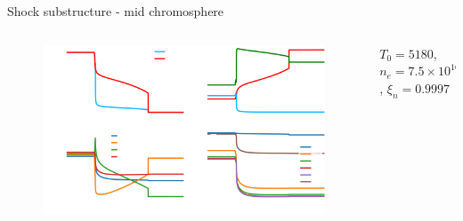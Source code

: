 \documentclass[10pt,aspectratio=169,usenames,dvipsnames]{beamer}
\begin{document}
\begin{frame}{Shock substructure - mid chromosphere}
\begin{columns}
\begin{column}{0.8\textwidth}
\begin{figure}
    \includegraphics[width=0.95\linewidth]{2023StAndrewsAstro/Figures/shocksub2_plot_midc_corrected.png}
    \label{fig:upperchromocontext}
\end{figure}
\end{column}
\begin{column}{0.2\textwidth}
    $T_0=5180$, $n_e=7.5\times 10^{16}$, $\xi_n=0.9997$
\end{column}
\end{columns}
\end{frame}

\end{document}
